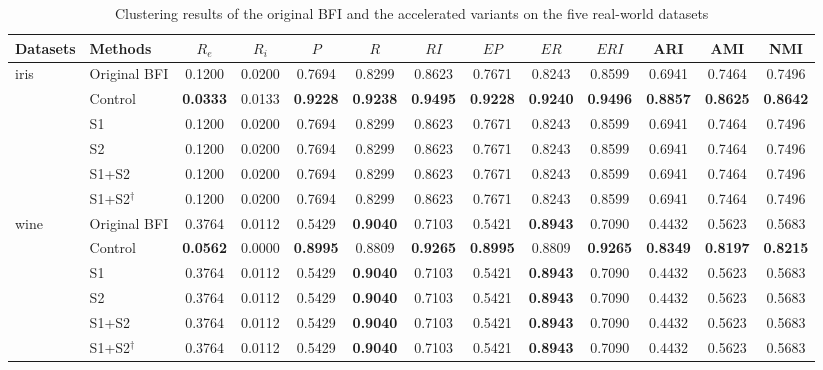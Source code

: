 \documentclass[journal]{IEEEtran}
\begin{document}
\begin{table}[!t]
\centering
\caption{Clustering results of the original BFI and the accelerated variants on the five real-world datasets}
\label{tab:real}
\scriptsize
\setlength{\tabcolsep}{4.2pt}
\begin{tabular}{llccccccccccc}
\toprule
Datasets & Methods & $R_e$ & $R_i$ & $P$ & $R$ & $RI$ & $EP$ & $ER$ & $ERI$ & ARI & AMI & NMI \\
\midrule
\multirow{6}{*}{iris} & Original BFI & 0.1200 & 0.0200 & 0.7694 & 0.8299 & 0.8623 & 0.7671 & 0.8243 & 0.8599 & 0.6941 & 0.7464 & 0.7496 \\
 & Control & \textbf{0.0333} & 0.0133 & \textbf{0.9228} & \textbf{0.9238} & \textbf{0.9495} & \textbf{0.9228} & \textbf{0.9240} & \textbf{0.9496} & \textbf{0.8857} & \textbf{0.8625} & \textbf{0.8642} \\
 & S1 & 0.1200 & 0.0200 & 0.7694 & 0.8299 & 0.8623 & 0.7671 & 0.8243 & 0.8599 & 0.6941 & 0.7464 & 0.7496 \\
 & S2 & 0.1200 & 0.0200 & 0.7694 & 0.8299 & 0.8623 & 0.7671 & 0.8243 & 0.8599 & 0.6941 & 0.7464 & 0.7496 \\
 & S1+S2 & 0.1200 & 0.0200 & 0.7694 & 0.8299 & 0.8623 & 0.7671 & 0.8243 & 0.8599 & 0.6941 & 0.7464 & 0.7496 \\
 & S1+S2$^{\dagger}$ & 0.1200 & 0.0200 & 0.7694 & 0.8299 & 0.8623 & 0.7671 & 0.8243 & 0.8599 & 0.6941 & 0.7464 & 0.7496 \\
\midrule
\multirow{6}{*}{wine} & Original BFI & 0.3764 & 0.0112 & 0.5429 & \textbf{0.9040} & 0.7103 & 0.5421 & \textbf{0.8943} & 0.7090 & 0.4432 & 0.5623 & 0.5683 \\
 & Control & \textbf{0.0562} & 0.0000 & \textbf{0.8995} & 0.8809 & \textbf{0.9265} & \textbf{0.8995} & 0.8809 & \textbf{0.9265} & \textbf{0.8349} & \textbf{0.8197} & \textbf{0.8215} \\
 & S1 & 0.3764 & 0.0112 & 0.5429 & \textbf{0.9040} & 0.7103 & 0.5421 & \textbf{0.8943} & 0.7090 & 0.4432 & 0.5623 & 0.5683 \\
 & S2 & 0.3764 & 0.0112 & 0.5429 & \textbf{0.9040} & 0.7103 & 0.5421 & \textbf{0.8943} & 0.7090 & 0.4432 & 0.5623 & 0.5683 \\
 & S1+S2 & 0.3764 & 0.0112 & 0.5429 & \textbf{0.9040} & 0.7103 & 0.5421 & \textbf{0.8943} & 0.7090 & 0.4432 & 0.5623 & 0.5683 \\
 & S1+S2$^{\dagger}$ & 0.3764 & 0.0112 & 0.5429 & \textbf{0.9040} & 0.7103 & 0.5421 & \textbf{0.8943} & 0.7090 & 0.4432 & 0.5623 & 0.5683 \\

\end{tabular}
\end{table}
\end{document}

